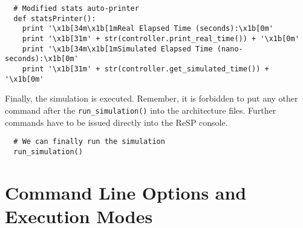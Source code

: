 \scriptsize
\begin{verbatim}
  # Modified stats auto-printer
  def statsPrinter():
    print '\x1b[34m\x1b[1mReal Elapsed Time (seconds):\x1b[0m'
    print '\x1b[31m' + str(controller.print_real_time()) + '\x1b[0m'
    print '\x1b[34m\x1b[1mSimulated Elapsed Time (nano-seconds):\x1b[0m'
    print '\x1b[31m' + str(controller.get_simulated_time()) + '\x1b[0m'
\end{verbatim}
\normalsize

\indent Finally, the simulation is executed. Remember, it is forbidden to put any other command after the \texttt{run\_simulation()} into the architecture files. Further commands have to be issued directly into the ReSP console.

\scriptsize
\begin{verbatim}
  # We can finally run the simulation
  run_simulation()
\end{verbatim}
\normalsize

\section{Command Line Options and Execution Modes}
\label{general:modes}
